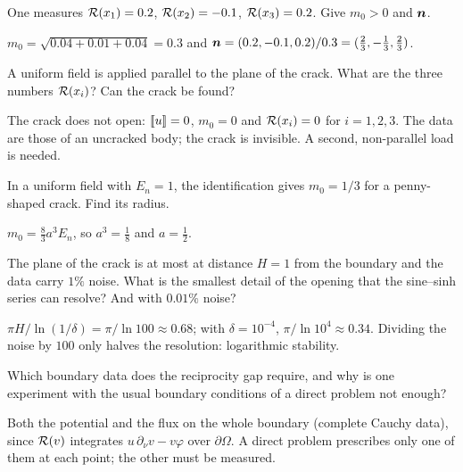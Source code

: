 \label{exo:rg-q-normal}
One measures $\mathcal{R}(x_1)=0.2$, $\mathcal{R}(x_2)=-0.1$, $\mathcal{R}(x_3)=0.2$. Give $m_0>0$ and
$\bm{n}$.
\begin{solution}
$m_0=\sqrt{0.04+0.01+0.04}=0.3$ and $\bm{n}=(0.2,-0.1,0.2)/0.3=(\tfrac23,-\tfrac13,\tfrac23)$.
\end{solution}

\label{exo:rg-q-blind}
A uniform field is applied parallel to the plane of the crack. What are the
three numbers $\mathcal{R}(x_i)$? Can the crack be found?
\begin{solution}
The crack does not open: $[\![u]\!]=0$, $m_0=0$ and $\mathcal{R}(x_i)=0$ for $i=1,2,3$.
The data are those of an uncracked body; the crack is invisible. A second,
non-parallel load is needed.
\end{solution}

\label{exo:rg-q-penny}
In a uniform field with $E_n=1$, the identification gives $m_0=1/3$ for a
penny-shaped crack. Find its radius.
\begin{solution}
$m_0=\tfrac83a^3E_n$, so $a^3=\tfrac18$ and $a=\tfrac12$.
\end{solution}

\label{exo:rg-q-resolution}
The plane of the crack is at most at distance $H=1$ from the boundary and
the data carry $1\%$ noise. What is the smallest detail of the opening that
the sine--sinh series can resolve? And with $0.01\%$ noise?
\begin{solution}
$\pi H/\ln(1/\delta)=\pi/\ln100\approx0.68$; with $\delta=10^{-4}$,
$\pi/\ln10^4\approx0.34$. Dividing the noise by $100$ only halves the
resolution: logarithmic stability.
\end{solution}

\label{exo:rg-q-data}
Which boundary data does the reciprocity gap require, and why is one
experiment with the usual boundary conditions of a direct problem not
enough?
\begin{solution}
Both the potential and the flux on the whole boundary (complete Cauchy
data), since $\mathcal{R}(v)$ integrates $u\,\partial_\nu v-v\varphi$ over
$\partial\Omega$. A direct problem prescribes only one of them at each point;
the other must be measured.
\end{solution}



